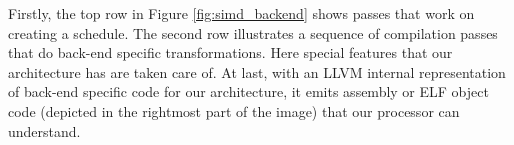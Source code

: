 

Firstly, the top row in Figure \ref{fig:simd_backend} shows passes that work on creating a schedule. The second row illustrates a sequence of compilation passes that do back-end specific transformations. Here special features that our architecture has are taken care of. At last, with an LLVM internal representation of back-end specific code for our architecture, it emits assembly or ELF object code (depicted in the rightmost part of the image) that our processor can understand.

